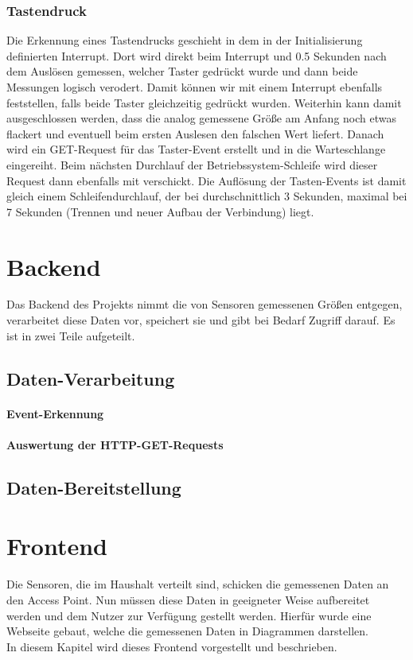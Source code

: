 \documentclass[12pt,a4paper,twoside]{article}
\begin{document}
\subsubsection{Tastendruck}
Die Erkennung eines Tastendrucks geschieht in dem in der Initialisierung definierten Interrupt. Dort wird direkt beim Interrupt und 0.5 Sekunden nach dem Auslösen gemessen, welcher Taster gedrückt wurde und dann beide Messungen logisch verodert. Damit können wir mit einem Interrupt ebenfalls feststellen, falls beide Taster gleichzeitig gedrückt wurden. Weiterhin kann damit ausgeschlossen werden, dass die analog gemessene Größe am Anfang noch etwas flackert und eventuell beim ersten Auslesen den falschen Wert liefert. Danach wird ein GET-Request für das Taster-Event erstellt und in die Warteschlange eingereiht. Beim nächsten Durchlauf der Betriebssystem-Schleife wird dieser Request dann ebenfalls mit verschickt. Die Auflösung der Tasten-Events ist damit gleich einem Schleifendurchlauf, der bei durchschnittlich 3 Sekunden, maximal bei 7 Sekunden (Trennen und neuer Aufbau der Verbindung) liegt. 

\section{Backend}
Das Backend des Projekts nimmt die von Sensoren gemessenen Größen entgegen, verarbeitet diese Daten vor, speichert sie und gibt bei Bedarf Zugriff darauf. Es ist in zwei Teile aufgeteilt.  

\subsection{Daten-Verarbeitung}
\paragraph{Event-Erkennung}
\paragraph{Auswertung der HTTP-GET-Requests}


\subsection{Daten-Bereitstellung}

\section{Frontend}
Die Sensoren, die im Haushalt verteilt sind, schicken die gemessenen Daten an den Access Point. Nun müssen diese Daten in geeigneter Weise aufbereitet werden und dem Nutzer zur Verfügung gestellt werden. Hierfür wurde eine Webseite gebaut, welche die gemessenen Daten in Diagrammen darstellen. \\
In diesem Kapitel wird dieses Frontend vorgestellt und beschrieben.
\end{document}
